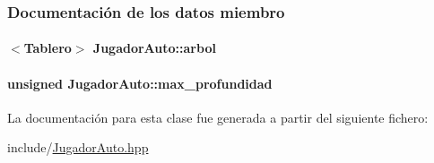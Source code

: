 \subsubsection{Documentación de los datos miembro}
\hypertarget{classJugadorAuto_a0ceb9994f364572f00abf5c490b50319}{
\paragraph[{arbol}]{$<${\bf Tablero}$>$ Jugador\-Auto\-::arbol\hspace{0.3cm}{\ttfamily [private]}}}\label{classJugadorAuto_a0ceb9994f364572f00abf5c490b50319}
\hypertarget{classJugadorAuto_a442a2ba01ebcc71283833176e214b7d3}{
\paragraph[{max\-\_\-profundidad}]{\setlength{\rightskip}{0pt plus 5cm}unsigned Jugador\-Auto\-::max\-\_\-profundidad\hspace{0.3cm}{\ttfamily [private]}}}\label{classJugadorAuto_a442a2ba01ebcc71283833176e214b7d3}


La documentación para esta clase fue generada a partir del siguiente fichero\-:\begin{DoxyCompactItemize}
\item 
include/\hyperlink{JugadorAuto_8hpp}{Jugador\-Auto.\-hpp}\end{DoxyCompactItemize}
